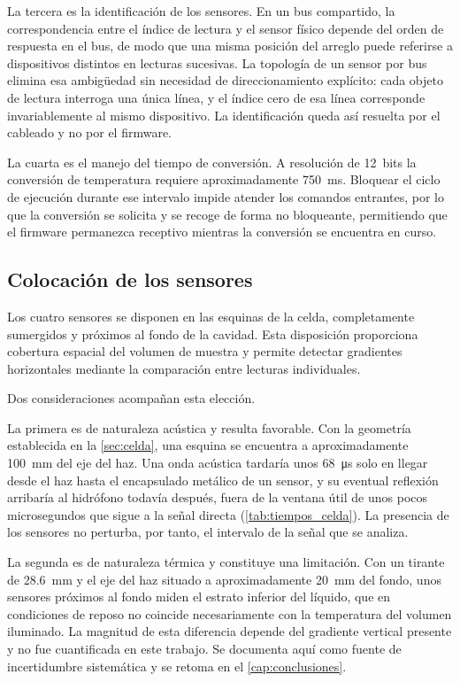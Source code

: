 La tercera es la identificación de los sensores. En un bus compartido,
la correspondencia entre el índice de lectura y el sensor físico
depende del orden de respuesta en el bus, de modo que una misma
posición del arreglo puede referirse a dispositivos distintos en
lecturas sucesivas. La topología de un sensor por bus elimina esa
ambigüedad sin necesidad de direccionamiento explícito: cada objeto de
lectura interroga una única línea, y el índice cero de esa línea
corresponde invariablemente al mismo dispositivo. La identificación
queda así resuelta por el cableado y no por el firmware.

La cuarta es el manejo del tiempo de conversión. A resolución de
\SI{12}{bits} la conversión de temperatura requiere aproximadamente
\SI{750}{\milli\second}. Bloquear el ciclo de ejecución durante ese
intervalo impide atender los comandos entrantes, por lo que la
conversión se solicita y se recoge de forma no bloqueante,
permitiendo que el firmware permanezca receptivo mientras la
conversión se encuentra en curso.

\subsection*{Colocación de los sensores}

Los cuatro sensores se disponen en las esquinas de la celda,
completamente sumergidos y próximos al fondo de la cavidad. Esta
disposición proporciona cobertura espacial del volumen de muestra y
permite detectar gradientes horizontales mediante la comparación
entre lecturas individuales.

Dos consideraciones acompañan esta elección.

La primera es de naturaleza acústica y resulta favorable. Con la
geometría establecida en la \cref{sec:celda}, una esquina se
encuentra a aproximadamente \SI{100}{\milli\meter} del eje del haz.
Una onda acústica tardaría unos \SI{68}{\micro\second} solo en llegar
desde el haz hasta el encapsulado metálico de un sensor, y su eventual
reflexión arribaría al hidrófono todavía después, fuera de la ventana
útil de unos pocos microsegundos que sigue a la señal directa
(\cref{tab:tiempos_celda}). La
presencia de los sensores no perturba, por tanto, el intervalo de la
señal que se analiza.

La segunda es de naturaleza térmica y constituye una limitación. Con
un tirante de \SI{28.6}{\milli\meter} y el eje del haz situado a
aproximadamente \SI{20}{\milli\meter} del fondo, unos sensores
próximos al fondo miden el estrato inferior del líquido, que en
condiciones de reposo no coincide necesariamente con la temperatura
del volumen iluminado. La magnitud de esta diferencia
depende del gradiente vertical presente y no fue cuantificada en este
trabajo. Se documenta aquí como fuente de incertidumbre sistemática y
se retoma en el \cref{cap:conclusiones}.

